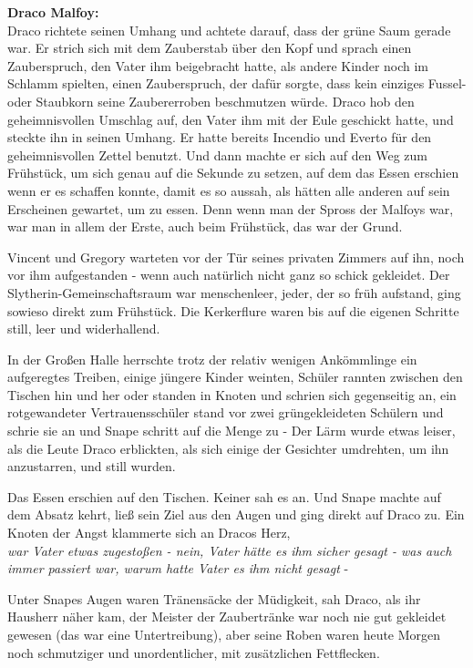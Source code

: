 {\textbf{Draco Malfoy:}\\ Draco richtete seinen Umhang und achtete darauf, dass der grüne Saum gerade war. Er strich sich mit dem Zauberstab über den Kopf und sprach einen Zauberspruch, den Vater ihm beigebracht hatte, als andere Kinder noch im Schlamm spielten, einen Zauberspruch, der dafür sorgte, dass kein einziges Fussel- oder Staubkorn seine Zaubererroben beschmutzen würde. Draco hob den geheimnisvollen Umschlag auf, den Vater ihm mit der Eule geschickt hatte, und steckte ihn in seinen Umhang. Er hatte bereits Incendio und Everto für den geheimnisvollen Zettel benutzt. Und dann machte er sich auf den Weg zum Frühstück, um sich genau auf die Sekunde zu setzen, auf dem das Essen erschien wenn er es schaffen konnte, damit es so aussah, als hätten alle anderen auf sein Erscheinen gewartet, um zu essen. Denn wenn man der Spross der Malfoys war, war man in allem der Erste, auch beim Frühstück, das war der Grund.

Vincent und Gregory warteten vor der Tür seines privaten Zimmers auf ihn, noch vor ihm aufgestanden - wenn auch natürlich nicht ganz so schick gekleidet. Der Slytherin-Gemeinschaftsraum war menschenleer, jeder, der so früh aufstand, ging sowieso direkt zum Frühstück. Die Kerkerflure waren bis auf die eigenen Schritte still, leer und widerhallend.

In der Großen Halle herrschte trotz der relativ wenigen Ankömmlinge ein aufgeregtes Treiben, einige jüngere Kinder weinten, Schüler rannten zwischen den Tischen hin und her oder standen in Knoten und schrien sich gegenseitig an, ein rotgewandeter Vertrauensschüler stand vor zwei grüngekleideten Schülern und schrie sie an und Snape schritt auf die Menge zu - Der Lärm wurde etwas leiser, als die Leute Draco erblickten, als sich einige der Gesichter umdrehten, um ihn anzustarren, und still wurden.

Das Essen erschien auf den Tischen. Keiner sah es an. Und Snape machte auf dem Absatz kehrt, ließ sein Ziel aus den Augen und ging direkt auf Draco zu. Ein Knoten der Angst klammerte sich an Dracos Herz,\\ \emph{war Vater etwas zugestoßen - nein, Vater hätte es ihm sicher gesagt - was auch immer passiert war, warum hatte Vater es ihm nicht gesagt} -

Unter Snapes Augen waren Tränensäcke der Müdigkeit, sah Draco, als ihr Hausherr näher kam, der Meister der Zaubertränke war noch nie gut gekleidet gewesen (das war eine Untertreibung), aber seine Roben waren heute Morgen noch schmutziger und unordentlicher, mit zusätzlichen Fettflecken.

}
